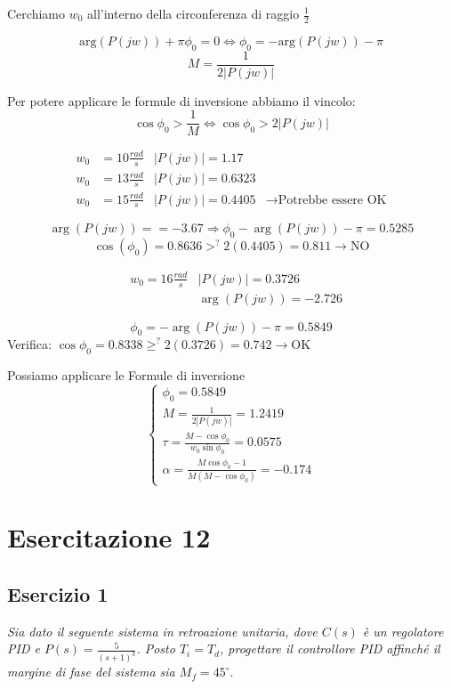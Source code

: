 \documentclass{article}
\begin{document}
Cerchiamo $w_0$ all'interno della circonferenza di raggio $\frac{1}{2}$

\[ \text{arg}(P(jw)) + \pi \phi_0 = 0 \Leftrightarrow \phi_0 = -\text{arg}(P(jw)) -\pi \]
\[ M = \frac{1}{2 |P(jw)|} \]

Per potere applicare le formule di inversione abbiamo il vincolo:
\[ \cos \phi_0 > \frac{1}{M} \Leftrightarrow \cos \phi_0 > 2 |P(jw)| \]

\[
\begin{aligned}
    w_0 &= 10 \frac{rad}{s} & |P(jw)| = 1.17\\
    w_0 &=13 \frac{rad}{s} & |P(jw)| = 0.6323\\
    w_0 &= 15\frac{rad}{s} & |P(jw)| = 0.4405& \rightarrow \text{Potrebbe essere OK}
\end{aligned}
\]

\[ \arg(P(jw)) =  = -3.67 \Rightarrow \phi_0 - \arg(P(jw)) - \pi = 0.5285 \]
\[ \cos (\phi_0) = 0.8636 >^? 2(0.4405) = 0.811 \rightarrow \text{NO}\]


\[
\begin{aligned}
    &w_0 = 16 \frac{rad}{s} & |P(jw)| = 0.3726\\
& & \arg(P(jw)) = -2.726
\end{aligned}
\]

\[ \phi_0 = -\arg(P(jw)) - \pi = 0.5849 \]
Verifica: $\cos \phi_0 = 0.8338 \ge^? 2(0.3726) = 0.742 \rightarrow \text{OK}$

Possiamo applicare le Formule di inversione
\[
\begin{cases}
    \phi_0 = 0.5849\\
    M = \frac{1}{2|P(jw)|} = 1.2419\\
    \tau = \frac{M - \cos\phi_0}{w_0 \sin \phi_0} = 0.0575\\
    \alpha = \frac{M\cos\phi_0 -1} {M(M - \cos \phi_0)} = - 0.174
\end{cases}
\]

\section{Esercitazione 12}
\subsection{Esercizio 1}
\textit{Sia dato il seguente sistema in retroazione unitaria, dove $C(s)$ \`e un regolatore PID e $P(s) = \frac{5}{(s+1)^3}$. Posto $T_i = T_d$, progettare il controllore PID affinch\'e il margine di fase del sistema sia $M_f = 45^\circ$}.
\bigbreak
\end{document}
